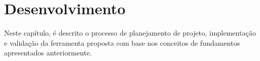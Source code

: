 \chapter{Desenvolvimento}

Neste capítulo, é descrito o processo de planejamento de projeto, implementação e validação da ferramenta proposta com base nos conceitos de fundamentos apresentados anteriormente.




